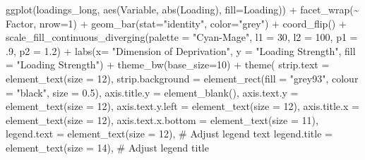 \documentclass[
  letterpaper,
  DIV=11,
  numbers=noendperiod]{scrreprt}
\newenvironment{Shaded}{\begin{snugshade}}{\end{snugshade}}
\newcommand{\AttributeTok}[1]{\textcolor[rgb]{0.40,0.45,0.13}{#1}}
\newcommand{\CommentTok}[1]{\textcolor[rgb]{0.37,0.37,0.37}{#1}}
\newcommand{\DecValTok}[1]{\textcolor[rgb]{0.68,0.00,0.00}{#1}}
\newcommand{\FloatTok}[1]{\textcolor[rgb]{0.68,0.00,0.00}{#1}}
\newcommand{\FunctionTok}[1]{\textcolor[rgb]{0.28,0.35,0.67}{#1}}
\newcommand{\NormalTok}[1]{\textcolor[rgb]{0.00,0.23,0.31}{#1}}
\newcommand{\SpecialCharTok}[1]{\textcolor[rgb]{0.37,0.37,0.37}{#1}}
\newcommand{\StringTok}[1]{\textcolor[rgb]{0.13,0.47,0.30}{#1}}
\begin{document}
\begin{Shaded}
\begin{Highlighting}[]
\FunctionTok{ggplot}\NormalTok{(loadings\_long, }\FunctionTok{aes}\NormalTok{(Variable, }\FunctionTok{abs}\NormalTok{(Loading), }\AttributeTok{fill=}\NormalTok{Loading)) }\SpecialCharTok{+} 
  \FunctionTok{facet\_wrap}\NormalTok{(}\SpecialCharTok{\textasciitilde{}}\NormalTok{ Factor, }\AttributeTok{nrow=}\DecValTok{1}\NormalTok{) }\SpecialCharTok{+} 
  \FunctionTok{geom\_bar}\NormalTok{(}\AttributeTok{stat=}\StringTok{"identity"}\NormalTok{, }\AttributeTok{color=}\StringTok{"grey"}\NormalTok{) }\SpecialCharTok{+} 
  \FunctionTok{coord\_flip}\NormalTok{() }\SpecialCharTok{+} 
  \FunctionTok{scale\_fill\_continuous\_diverging}\NormalTok{(}\AttributeTok{palette =} \StringTok{"Cyan{-}Mage"}\NormalTok{, }\AttributeTok{l1 =} \DecValTok{30}\NormalTok{, }\AttributeTok{l2 =} \DecValTok{100}\NormalTok{, }\AttributeTok{p1 =}\NormalTok{ .}\DecValTok{9}\NormalTok{, }\AttributeTok{p2 =} \FloatTok{1.2}\NormalTok{) }\SpecialCharTok{+}
  \FunctionTok{labs}\NormalTok{(}\AttributeTok{x=} \StringTok{"Dimension of Deprivation"}\NormalTok{, }\AttributeTok{y =} \StringTok{"Loading Strength"}\NormalTok{, }\AttributeTok{fill =} \StringTok{"Loading Strength"}\NormalTok{) }\SpecialCharTok{+}
  \FunctionTok{theme\_bw}\NormalTok{(}\AttributeTok{base\_size=}\DecValTok{10}\NormalTok{) }\SpecialCharTok{+}
  \FunctionTok{theme}\NormalTok{(}
    \AttributeTok{strip.text =} \FunctionTok{element\_text}\NormalTok{(}\AttributeTok{size =} \DecValTok{12}\NormalTok{),}
    \AttributeTok{strip.background =} \FunctionTok{element\_rect}\NormalTok{(}\AttributeTok{fill =} \StringTok{"grey93"}\NormalTok{, }\AttributeTok{colour =} \StringTok{"black"}\NormalTok{, }\AttributeTok{size =} \FloatTok{0.5}\NormalTok{),}
    \AttributeTok{axis.title.y =} \FunctionTok{element\_blank}\NormalTok{(),}
    \AttributeTok{axis.text.y =} \FunctionTok{element\_text}\NormalTok{(}\AttributeTok{size =} \DecValTok{12}\NormalTok{),}
    \AttributeTok{axis.text.y.left =} \FunctionTok{element\_text}\NormalTok{(}\AttributeTok{size =} \DecValTok{12}\NormalTok{),}
    \AttributeTok{axis.title.x =} \FunctionTok{element\_text}\NormalTok{(}\AttributeTok{size =} \DecValTok{12}\NormalTok{),}
    \AttributeTok{axis.text.x.bottom =} \FunctionTok{element\_text}\NormalTok{(}\AttributeTok{size =} \DecValTok{11}\NormalTok{),}
    \AttributeTok{legend.text =} \FunctionTok{element\_text}\NormalTok{(}\AttributeTok{size =} \DecValTok{12}\NormalTok{),  }\CommentTok{\# Adjust legend text}
    \AttributeTok{legend.title =} \FunctionTok{element\_text}\NormalTok{(}\AttributeTok{size =} \DecValTok{14}\NormalTok{),  }\CommentTok{\# Adjust legend title}

\end{Highlighting}
\end{Shaded}
\end{document}
